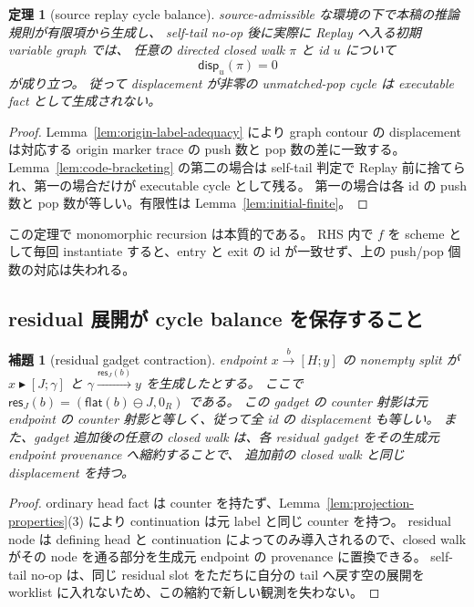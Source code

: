 \documentclass[uplatex,dvipdfmx,a4paper,10.5pt]{jsarticle}
\theoremstyle{jpplain}
\newtheorem{lemma}[definition]{補題}
\newtheorem{theorem}[definition]{定理}
\newcommand{\disp}{\mathsf{disp}}
\newcommand{\edge}[3]{#1\xrightarrow{#2}#3}
\newcommand{\epedge}[4]{#1\xrightarrow{#2}[#3;#4]}
\newcommand{\headfact}[3]{#1\mathrel{\blacktriangleright}[#2;#3]}
\begin{document}
\begin{theorem}[source replay cycle balance]\label{thm:source-cycle-balance}
source-admissible な環境の下で本稿の推論規則が有限項から生成し、
self-tail no-op 後に実際に Replay へ入る初期 variable graph では、
任意の directed closed walk $\pi$ と id $u$ について
\[
  \disp_u(\pi)=0
\]
が成り立つ。
従って displacement が非零の unmatched-pop cycle は executable fact として生成されない。
\end{theorem}

\begin{proof}
Lemma~\ref{lem:origin-label-adequacy} により graph contour の displacement は対応する origin marker trace の
push 数と pop 数の差に一致する。
Lemma~\ref{lem:code-bracketing} の第二の場合は self-tail 判定で Replay 前に捨てられ、第一の場合だけが executable cycle として残る。
第一の場合は各 id の push 数と pop 数が等しい。有限性は Lemma~\ref{lem:initial-finite}。
\end{proof}

この定理で monomorphic recursion は本質的である。
RHS 内で $f$ を scheme として毎回 instantiate すると、entry と exit の id が一致せず、上の push/pop 個数の対応は失われる。

\subsection{residual 展開が cycle balance を保存すること}

\begin{lemma}[residual gadget contraction]\label{lem:residual-contraction}
endpoint $\epedge{x}{b}{H}{y}$ の nonempty split が
$\headfact{x}{J}{\gamma}$ と
$\edge{\gamma}{\mathsf{res}_J(b)}{y}$ を生成したとする。
ここで $\mathsf{res}_J(b)=(\mathsf{flat}(b)\ominus J,0_R)$ である。
この gadget の counter 射影は元 endpoint の counter 射影と等しく、従って全 id の displacement も等しい。
また、gadget 追加後の任意の closed walk は、各 residual gadget をその生成元 endpoint provenance へ縮約することで、
追加前の closed walk と同じ displacement を持つ。
\end{lemma}

\begin{proof}
ordinary head fact は counter を持たず、Lemma~\ref{lem:projection-properties}(3) により continuation は元 label と同じ counter を持つ。
residual node は defining head と continuation によってのみ導入されるので、closed walk がその node を通る部分を生成元 endpoint の provenance に置換できる。
self-tail no-op は、同じ residual slot をただちに自分の tail へ戻す空の展開を worklist に入れないため、この縮約で新しい観測を失わない。
\end{proof}
\end{document}
